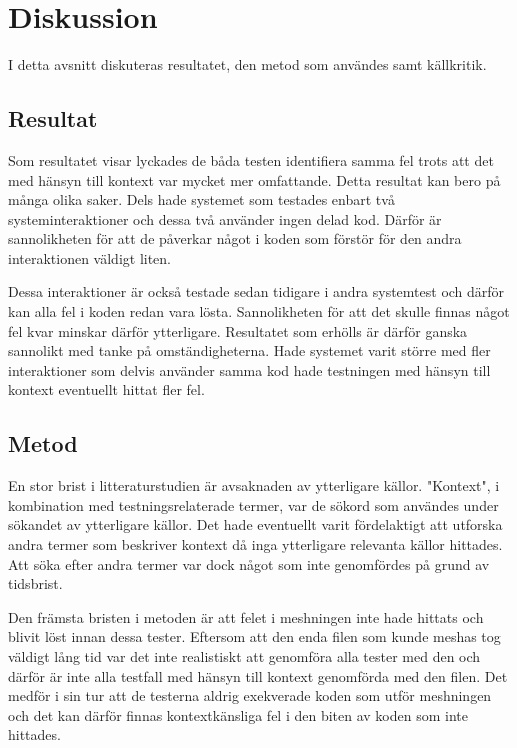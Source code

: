 \section{Diskussion}
\label{sec:discussion-holmberg}

I detta avsnitt diskuteras resultatet, den metod som användes samt källkritik.

\subsection{Resultat}

Som resultatet visar lyckades de båda testen identifiera samma fel trots att det med hänsyn till kontext var mycket mer omfattande. Detta resultat kan bero på många olika saker. Dels hade systemet som testades enbart två systeminteraktioner och dessa två använder ingen delad kod. Därför är sannolikheten för att de påverkar något i koden som förstör för den andra interaktionen väldigt liten.

Dessa interaktioner är också testade sedan tidigare i andra systemtest och därför kan alla fel i koden redan vara lösta. Sannolikheten för att det skulle finnas något fel kvar minskar därför ytterligare. Resultatet som erhölls är därför ganska sannolikt med tanke på omständigheterna. Hade systemet varit större med fler interaktioner som delvis använder samma kod hade testningen med hänsyn till kontext eventuellt hittat fler fel.

\subsection{Metod}

En stor brist i litteraturstudien är avsaknaden av ytterligare källor. "Kontext", i kombination med testningsrelaterade termer, var de sökord som användes under sökandet av ytterligare källor. Det hade eventuellt varit fördelaktigt att utforska andra termer som beskriver kontext då inga ytterligare relevanta källor hittades. Att söka efter andra termer var dock något som inte genomfördes på grund av tidsbrist.

Den främsta bristen i metoden är att felet i meshningen inte hade hittats och blivit löst innan dessa tester. Eftersom att den enda filen som kunde meshas tog väldigt lång tid var det inte realistiskt att genomföra alla tester med den och därför är inte alla testfall med hänsyn till kontext genomförda med den filen. Det medför i sin tur att de testerna aldrig exekverade koden som utför meshningen och det kan därför finnas kontextkänsliga fel i den biten av koden som inte hittades.

